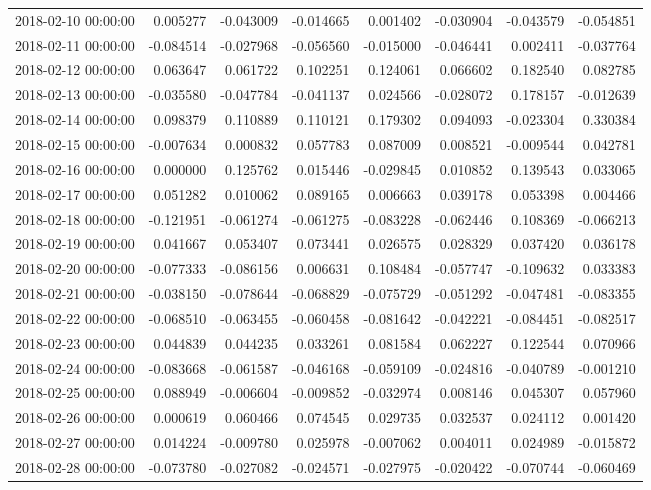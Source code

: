 \begin{tabular}{lrrrrrrr}
2018-02-10 00:00:00 & 0.005277 & -0.043009 & -0.014665 & 0.001402 & -0.030904 & -0.043579 & -0.054851 \\
2018-02-11 00:00:00 & -0.084514 & -0.027968 & -0.056560 & -0.015000 & -0.046441 & 0.002411 & -0.037764 \\
2018-02-12 00:00:00 & 0.063647 & 0.061722 & 0.102251 & 0.124061 & 0.066602 & 0.182540 & 0.082785 \\
2018-02-13 00:00:00 & -0.035580 & -0.047784 & -0.041137 & 0.024566 & -0.028072 & 0.178157 & -0.012639 \\
2018-02-14 00:00:00 & 0.098379 & 0.110889 & 0.110121 & 0.179302 & 0.094093 & -0.023304 & 0.330384 \\
2018-02-15 00:00:00 & -0.007634 & 0.000832 & 0.057783 & 0.087009 & 0.008521 & -0.009544 & 0.042781 \\
2018-02-16 00:00:00 & 0.000000 & 0.125762 & 0.015446 & -0.029845 & 0.010852 & 0.139543 & 0.033065 \\
2018-02-17 00:00:00 & 0.051282 & 0.010062 & 0.089165 & 0.006663 & 0.039178 & 0.053398 & 0.004466 \\
2018-02-18 00:00:00 & -0.121951 & -0.061274 & -0.061275 & -0.083228 & -0.062446 & 0.108369 & -0.066213 \\
2018-02-19 00:00:00 & 0.041667 & 0.053407 & 0.073441 & 0.026575 & 0.028329 & 0.037420 & 0.036178 \\
2018-02-20 00:00:00 & -0.077333 & -0.086156 & 0.006631 & 0.108484 & -0.057747 & -0.109632 & 0.033383 \\
2018-02-21 00:00:00 & -0.038150 & -0.078644 & -0.068829 & -0.075729 & -0.051292 & -0.047481 & -0.083355 \\
2018-02-22 00:00:00 & -0.068510 & -0.063455 & -0.060458 & -0.081642 & -0.042221 & -0.084451 & -0.082517 \\
2018-02-23 00:00:00 & 0.044839 & 0.044235 & 0.033261 & 0.081584 & 0.062227 & 0.122544 & 0.070966 \\
2018-02-24 00:00:00 & -0.083668 & -0.061587 & -0.046168 & -0.059109 & -0.024816 & -0.040789 & -0.001210 \\
2018-02-25 00:00:00 & 0.088949 & -0.006604 & -0.009852 & -0.032974 & 0.008146 & 0.045307 & 0.057960 \\
2018-02-26 00:00:00 & 0.000619 & 0.060466 & 0.074545 & 0.029735 & 0.032537 & 0.024112 & 0.001420 \\
2018-02-27 00:00:00 & 0.014224 & -0.009780 & 0.025978 & -0.007062 & 0.004011 & 0.024989 & -0.015872 \\
2018-02-28 00:00:00 & -0.073780 & -0.027082 & -0.024571 & -0.027975 & -0.020422 & -0.070744 & -0.060469 \\

\end{tabular}
